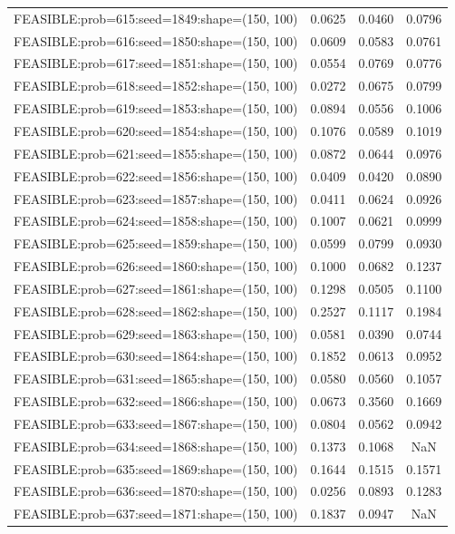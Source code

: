 \begin{longtable}{lccc}
FEASIBLE:prob=615:seed=1849:shape=(150, 100) & 0.0625 & 0.0460 & 0.0796 \\
FEASIBLE:prob=616:seed=1850:shape=(150, 100) & 0.0609 & 0.0583 & 0.0761 \\
FEASIBLE:prob=617:seed=1851:shape=(150, 100) & 0.0554 & 0.0769 & 0.0776 \\
FEASIBLE:prob=618:seed=1852:shape=(150, 100) & 0.0272 & 0.0675 & 0.0799 \\
FEASIBLE:prob=619:seed=1853:shape=(150, 100) & 0.0894 & 0.0556 & 0.1006 \\
FEASIBLE:prob=620:seed=1854:shape=(150, 100) & 0.1076 & 0.0589 & 0.1019 \\
FEASIBLE:prob=621:seed=1855:shape=(150, 100) & 0.0872 & 0.0644 & 0.0976 \\
FEASIBLE:prob=622:seed=1856:shape=(150, 100) & 0.0409 & 0.0420 & 0.0890 \\
FEASIBLE:prob=623:seed=1857:shape=(150, 100) & 0.0411 & 0.0624 & 0.0926 \\
FEASIBLE:prob=624:seed=1858:shape=(150, 100) & 0.1007 & 0.0621 & 0.0999 \\
FEASIBLE:prob=625:seed=1859:shape=(150, 100) & 0.0599 & 0.0799 & 0.0930 \\
FEASIBLE:prob=626:seed=1860:shape=(150, 100) & 0.1000 & 0.0682 & 0.1237 \\
FEASIBLE:prob=627:seed=1861:shape=(150, 100) & 0.1298 & 0.0505 & 0.1100 \\
FEASIBLE:prob=628:seed=1862:shape=(150, 100) & 0.2527 & 0.1117 & 0.1984 \\
FEASIBLE:prob=629:seed=1863:shape=(150, 100) & 0.0581 & 0.0390 & 0.0744 \\
FEASIBLE:prob=630:seed=1864:shape=(150, 100) & 0.1852 & 0.0613 & 0.0952 \\
FEASIBLE:prob=631:seed=1865:shape=(150, 100) & 0.0580 & 0.0560 & 0.1057 \\
FEASIBLE:prob=632:seed=1866:shape=(150, 100) & 0.0673 & 0.3560 & 0.1669 \\
FEASIBLE:prob=633:seed=1867:shape=(150, 100) & 0.0804 & 0.0562 & 0.0942 \\
FEASIBLE:prob=634:seed=1868:shape=(150, 100) & 0.1373 & 0.1068 &    NaN \\
FEASIBLE:prob=635:seed=1869:shape=(150, 100) & 0.1644 & 0.1515 & 0.1571 \\
FEASIBLE:prob=636:seed=1870:shape=(150, 100) & 0.0256 & 0.0893 & 0.1283 \\
FEASIBLE:prob=637:seed=1871:shape=(150, 100) & 0.1837 & 0.0947 &    NaN \\

\end{longtable}
